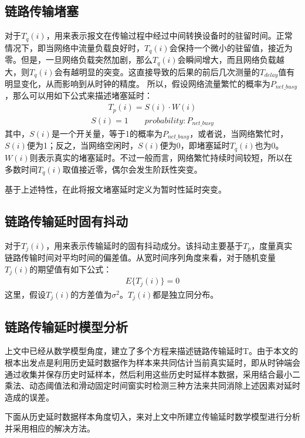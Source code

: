 \subsection{链路传输堵塞}
对于$T_{q}(i)$，用来表示报文在传输过程中经过中间转换设备时的驻留时间。正常情况下，即当网络中流量负载良好时，$T_{q}(i)$会保持一个微小的驻留值，接近为零。但是，一旦网络负载突然加剧，那么$T_{q}(i)$会瞬间增大，而且网络负载越大，则$T_{q}(i)$会有越明显的突变。这直接导致的后果的前后几次测量的$T_{delay}$值有明显变化，从而影响到从时钟的精度。
所以，假设网络流量繁忙的概率为$P_{net\_busy}$，那么可以用如下公式\supercite{33}来描述堵塞延时：
\begin {align}
T_{p}(i) = S(i) \cdot W(i) 
\end{align}
\begin {align}
S(i) = 1 \qquad probability: P_{net\_busy}
\end{align}
其中，$S(i)$是一个开关量，等于1的概率为$P_{net\_busy}$，或者说，当网络繁忙时，$S(i)$便为1；反之，当网络空闲时，$S(i)$便为0，即堵塞延时$T_{q}(i)$也为0。$W(i)$则表示真实的堵塞延时。不过一般而言，网络繁忙持续时间较短，所以在多数时间$T_{q}(i)$取值接近零，偶尔会发生阶跃性突变。

基于上述特性，在此将报文堵塞延时定义为暂时性延时突变。

\subsection{链路传输延时固有抖动}
对于$T_{j}(i)$，用来表示传输延时的固有抖动成分。该抖动主要基于$T_{p}$，度量真实链路传输时间对平均时间的偏差值。从宽时间序列角度来看，对于随机变量$T_{j}(i)$的期望值有如下公式\supercite{33}：
\begin {align}
E\{T_{j}(i)\} = 0
\end {align}
这里，假设$T_{j}(i)$的方差值为$\sigma ^{2}$。$T_{j}(i)$都是独立同分布。

\subsection{链路传输延时模型分析}
上文中已经从数学模型角度，建立了多个方程来描述链路传输延时T。由于本文的根本出发点是利用历史延时数据作为样本来共同估计当前真实延时，即从时钟端会通过收集并保存历史时延样本，然后利用这些历史时延样本数据，采用结合最小二乘法、动态阈值法和滑动固定时间窗实时检测三种方法来共同消除上述因素对延时造成的误差。

下面从历史延时数据样本角度切入，来对上文中所建立传输延时数学模型进行分析并采用相应的解决方法。

